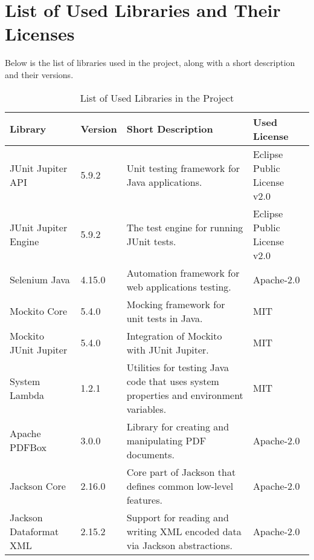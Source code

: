 \section{List of Used Libraries and Their Licenses}
Below is the list of libraries used in the project, along with a short description and their versions.
\begin{table}[ht!]
    \centering
    \setupBfhTabular
    \begin{tabular}{|p{4cm}|p{1cm}|p{5cm}|p{3cm}|} %
        \rowcolor{BFH-tablehead}
        \textbf{Library}       & \textbf{Version} & \textbf{Short Description}                                                             & \textbf{Used License}                            \\
        \hline
        JUnit Jupiter API & 5.9.2 & Unit testing framework for Java applications.
        & Eclipse Public License v2.0 \\
        \hline
        JUnit Jupiter Engine   & 5.9.2            & The test engine for running JUnit tests.
                                                      & Eclipse Public License v2.0 \\
        \hline
        Selenium Java          & 4.15.0           & Automation framework for web applications testing.
                                            & Apache-2.0 \\
        \hline
        Mockito Core           & 5.4.0            & Mocking framework for unit tests in Java.
                                                     & MIT \\
        \hline
        Mockito JUnit Jupiter  & 5.4.0            & Integration of Mockito with JUnit Jupiter.
                                                    & MIT \\
        \hline
        System Lambda          & 1.2.1            & Utilities for testing Java code that uses system properties and environment variables.
        & MIT \\
        \hline
        Apache PDFBox          & 3.0.0            & Library for creating and manipulating PDF documents.
                                          & Apache-2.0 \\
        \hline
        Jackson Core           & 2.16.0           & Core part of Jackson that defines common low-level features.
        & Apache-2.0  \\
        \hline
        Jackson Dataformat XML & 2.15.2           & Support for reading and writing XML encoded data via Jackson abstractions.
        & Apache-2.0 \\
        \hline
    \end{tabular}
    \caption{List of Used Libraries in the Project}
    \label{table:used-libraries}
\end{table}
